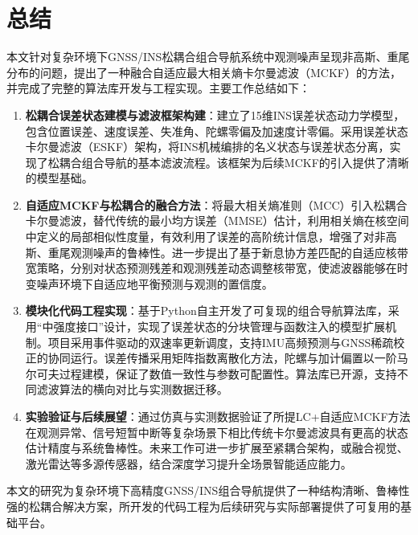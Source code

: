 \chapter{总结}



本文针对复杂环境下GNSS/INS松耦合组合导航系统中观测噪声呈现非高斯、重尾分布的问题，提出了一种融合自适应最大相关熵卡尔曼滤波（MCKF）的方法，并完成了完整的算法库开发与工程实现。主要工作总结如下：

\begin{enumerate}
\item \textbf{松耦合误差状态建模与滤波框架构建}：建立了15维INS误差状态动力学模型，包含位置误差、速度误差、失准角、陀螺零偏及加速度计零偏。采用误差状态卡尔曼滤波（ESKF）架构，将INS机械编排的名义状态与误差状态分离，实现了松耦合组合导航的基本滤波流程。该框架为后续MCKF的引入提供了清晰的模型基础。

\item \textbf{自适应MCKF与松耦合的融合方法}：将最大相关熵准则（MCC）引入松耦合卡尔曼滤波，替代传统的最小均方误差（MMSE）估计，利用相关熵在核空间中定义的局部相似性度量，有效利用了误差的高阶统计信息，增强了对非高斯、重尾观测噪声的鲁棒性。进一步提出了基于新息协方差匹配的自适应核带宽策略，分别对状态预测残差和观测残差动态调整核带宽，使滤波器能够在时变噪声环境下自适应地平衡预测与观测的置信度。

\item \textbf{模块化代码工程实现}：基于Python自主开发了可复现的组合导航算法库，采用“中强度接口”设计，实现了误差状态的分块管理与函数注入的模型扩展机制。项目采用事件驱动的双速率更新调度，支持IMU高频预测与GNSS稀疏校正的协同运行。误差传播采用矩阵指数离散化方法，陀螺与加计偏置以一阶马尔可夫过程建模，保证了数值一致性与参数可配置性。算法库已开源，支持不同滤波算法的横向对比与实测数据迁移。

\item \textbf{实验验证与后续展望}：通过仿真与实测数据验证了所提LC+自适应MCKF方法在观测异常、信号短暂中断等复杂场景下相比传统卡尔曼滤波具有更高的状态估计精度与系统鲁棒性。未来工作可进一步扩展至紧耦合架构，或融合视觉、激光雷达等多源传感器，结合深度学习提升全场景智能适应能力。
\end{enumerate}

本文的研究为复杂环境下高精度GNSS/INS组合导航提供了一种结构清晰、鲁棒性强的松耦合解决方案，所开发的代码工程为后续研究与实际部署提供了可复用的基础平台。